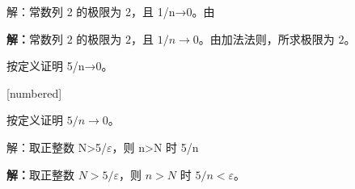 \documentclass[aspectratio=169,10pt,fontset=fandol]{ctexbeamer}
\makeatletter
\newcommand{\mathagentexerciselabelcontext}[1]{%
\hypertarget<1>{#1}{}%
\edef\@currentHref{#1}%
}
\makeatother
\begin{document}
\begin{frame}[t,fragile]{解：常数列 2 的极限为 2，且 1/n→0。由}
\normalsize
{\normalsize
\par\noindent\textbf{解：}常数列 $2$ 的极限为 $2$，且 $1/n\to0$。由加法法则，所求极限为 $2$。\par

}
\end{frame}
\begin{frame}[t,fragile]{按定义证明 5/n→0。}
\normalsize
{\normalsize
[numbered]
\mathagentexerciselabelcontext{mathagent.exercise.U0016.0}
\begin{exercise}
\label{mathagent:exercise:f708d5de6eeb2a0d1d46cddf76922686b9f273c43bd0798e15293c1e0afd54ab}
按定义证明 $5/n\to0$。
\end{exercise}
}
\end{frame}
\begin{frame}[t,fragile]{解：取正整数 N>5/\texorpdfstring{\ensuremath{\varepsilon}}{ε}，则 n>N 时 5/n}
\normalsize
{\normalsize
\par\noindent\textbf{解：}取正整数 $N>5/\varepsilon$，则 $n>N$ 时 $5/n<\varepsilon$。\par

}
\end{frame}
\end{document}
